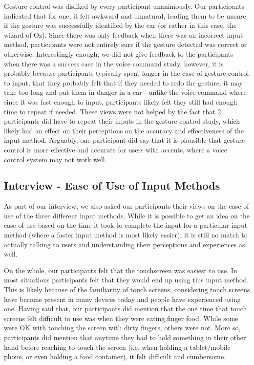 \documentclass{sigchi}
\begin{document}
Gesture control was disliked by every participant unanimously. Our participants indicated that for one, it felt awkward and unnatural, leading them to be unsure if the gesture was successfully identified by the car (or rather in this case, the wizard of Oz). Since there was only feedback when there was an incorrect input method, participants were not entirely sure if the gesture detected was correct or otherwise. Interestingly enough, we did not give feedback to the participants when there was a success case in the voice command study, however, it is probably because participants typically spent longer in the case of gesture control to input, that they probably felt that if they needed to redo the gesture, it may take too long and put them in danger in a car - unlike the voice command where since it was fast enough to input, participants likely felt they still had enough time to repeat if needed. These views were not helped by the fact that 2 participants did have to repeat their inputs in the  gesture control study, which likely had an effect on their perceptions on the accuracy and effectiveness of the input method. Arguably, one participant did say that it is plausible that gesture control is more effective and accurate for users with accents, where a voice control system may not work well.

\subsection{Interview - Ease of Use of Input Methods}

As part of our interview, we also asked our participants their views on the ease of use of the three different input methods. While it is possible to get an idea on the ease of use based on the time it took to complete the input for a particular input method (where a faster input method is most likely easier), it is still no match to actually talking to users and understanding their perceptions and experiences as well.

On the whole, our participants felt that the touchscreen was easiest to use. In most situations participants felt that they would end up using this input method. This is likely because of the familiarity of touch screens, considering touch screens have become present in many devices today and people have experienced using one. Having said that, our participants did mention that the one time that touch screens felt difficult to use was when they were eating finger food. While some were OK with touching the screen with dirty fingers, others were not. More so, participants did mention that anytime they had to hold something in their other hand before reaching to touch the screen (i.e. when holding a tablet/mobile phone, or even holding a food container), it felt difficult and cumbersome.
\end{document}
